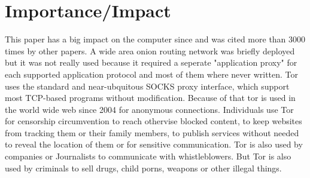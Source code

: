 


\section{Importance/Impact}
This paper has a big impact on the computer since and was cited more than 3000 times by other papers. A wide area onion routing network was briefly deployed but it was not really used because it required a seperate "application proxy" for each supported application protocol and most of them where never written. Tor uses the standard and near-ubquitous SOCKS proxy interface, which support most TCP-based programs without modification.
Because of that tor is used in the world wide web since 2004 for anonymous connections. Individuals use Tor for censorship circumvention to reach othervise blocked content, to keep websites from tracking them or their family members, to publish services without needed to reveal the location of them or for sensitive communication. Tor is also used by companies or Journalists to communicate with whistleblowers\cite{tor}. But Tor is also used by criminals to sell drugs, child porns, weapons or other illegal things.   